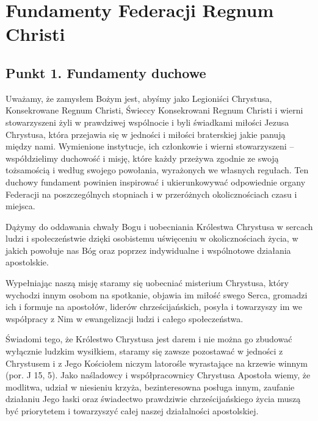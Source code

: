\chapter{Fundamenty Federacji Regnum Christi}


\section{Punkt 1. Fundamenty duchowe}




 Uważamy, że zamysłem Bożym jest, abyśmy jako Legioniści Chrystusa, Konsekrowane Regnum Christi, Świeccy Konsekrowani Regnum Christi i wierni stowarzyszeni żyli w prawdziwej wspólnocie i byli świadkami miłości Jezusa Chrystusa, która przejawia się w jedności  i miłości braterskiej jakie panują między nami. Wymienione instytucje, ich członkowie i wierni stowarzyszeni – współdzielimy duchowość i misję, które każdy przeżywa zgodnie ze swoją tożsamością i według swojego powołania, wyrażonych we własnych regułach. Ten duchowy fundament powinien inspirować i ukierunkowywać odpowiednie organy Federacji na poszczególnych stopniach i w przeróżnych okolicznościach czasu i miejsca.




 Dążymy do oddawania chwały Bogu i uobecniania Królestwa Chrystusa w sercach ludzi i społeczeństwie dzięki osobistemu uświęceniu w okolicznościach życia, w jakich powołuje nas Bóg oraz poprzez indywidualne i wspólnotowe działania apostolskie.


 
 Wypełniając naszą misję staramy się uobecniać misterium Chrystusa, który wychodzi innym osobom na spotkanie, objawia im miłość swego Serca, gromadzi ich i formuje na apostołów, liderów chrześcijańskich, posyła i towarzyszy im we współpracy z Nim w ewangelizacji ludzi i całego społeczeństwa.


 
 {Ś}wiadomi tego, że Królestwo Chrystusa jest darem i nie można go zbudować wyłącznie ludzkim wysiłkiem, staramy się zawsze pozostawać w jedności z Chrystusem i z Jego Kościołem niczym latorośle wyrastające na krzewie winnym (por. J 15, 5). Jako naśladowcy i współpracownicy Chrystusa Apostoła wiemy, że modlitwa, udział w niesieniu krzyża, bezinteresowna posługa innym, zaufanie działaniu Jego łaski oraz świadectwo prawdziwie chrześcijańskiego życia muszą być priorytetem i towarzyszyć całej naszej działalności apostolskiej.
 
